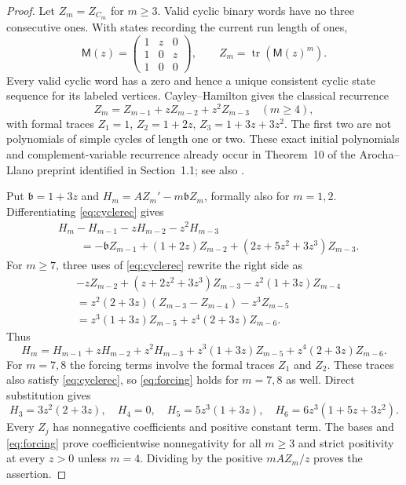 \documentclass[11pt]{article}
\begin{document}
\begin{proof}
Let $Z_m=Z_{C_m}$ for $m\ge3$. Valid cyclic binary words have no three consecutive ones. With states recording the current run length of ones,
\[
 \mathsf M(z)=\begin{pmatrix}1&z&0\\1&0&z\\1&0&0\end{pmatrix},\qquad
 Z_m=\operatorname{tr}(\mathsf M(z)^m).
\]
Every valid cyclic word has a zero and hence a unique consistent cyclic state sequence for its labeled vertices. Cayley--Hamilton gives the classical recurrence
\begin{equation}\label{eq:cyclerec}
 Z_m=Z_{m-1}+zZ_{m-2}+z^2Z_{m-3}\quad(m\ge4),
\end{equation}
with formal traces $Z_1=1$, $Z_2=1+2z$, $Z_3=1+3z+3z^2$. The first two are not polynomials of simple cycles of length one or two. These exact initial polynomials and complement-variable recurrence already occur in Theorem~10 of the Arocha--Llano preprint identified in Section~1.1; see also \cite[Theorem 4.5]{AP2010}.

Put $\mathfrak b=1+3z$ and $H_m=AZ_m'-m\mathfrak b Z_m$, formally also for $m=1,2$. Differentiating \eqref{eq:cyclerec} gives
\begin{align*}
 &H_m-H_{m-1}-zH_{m-2}-z^2H_{m-3}\\
 &\qquad=-\mathfrak b Z_{m-1}+(1+2z)Z_{m-2}+(2z+5z^2+3z^3)Z_{m-3}.
\end{align*}
For $m\ge7$, three uses of \eqref{eq:cyclerec} rewrite the right side as
\begin{align*}
 &-zZ_{m-2}+(z+2z^2+3z^3)Z_{m-3}-z^2(1+3z)Z_{m-4}\\
 &=z^2(2+3z)(Z_{m-3}-Z_{m-4})-z^3Z_{m-5}\\
 &=z^3(1+3z)Z_{m-5}+z^4(2+3z)Z_{m-6}.
\end{align*}
Thus
\begin{equation}\label{eq:forcing}
 H_m=H_{m-1}+zH_{m-2}+z^2H_{m-3}
       +z^3(1+3z)Z_{m-5}+z^4(2+3z)Z_{m-6}.
\end{equation}
For $m=7,8$ the forcing terms involve the formal traces $Z_1$ and $Z_2$. These traces also satisfy \eqref{eq:cyclerec}, so \eqref{eq:forcing} holds for $m=7,8$ as well. Direct substitution gives
\[
 H_3=3z^2(2+3z),\quad H_4=0,\quad
 H_5=5z^3(1+3z),\quad H_6=6z^3(1+5z+3z^2).
\]
Every $Z_j$ has nonnegative coefficients and positive constant term. The bases and \eqref{eq:forcing} prove coefficientwise nonnegativity for all $m\ge3$ and strict positivity at every $z>0$ unless $m=4$. Dividing by the positive $mAZ_m/z$ proves the assertion.
\end{proof}
\end{document}

